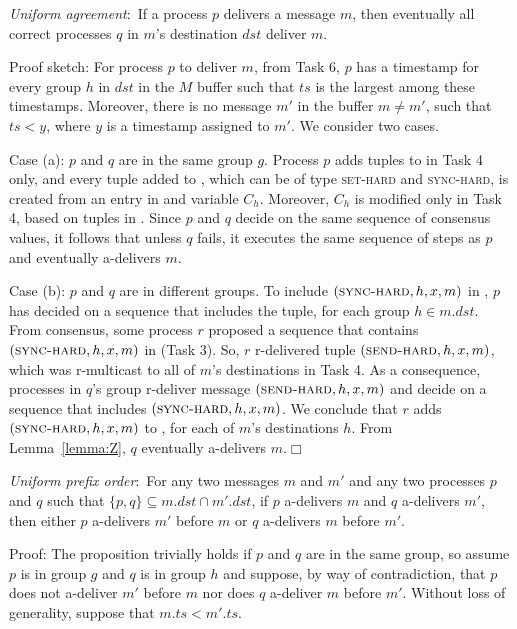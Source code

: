 \setcounter{proposition}{4}
\begin{proposition}
\textit{Uniform agreement}:~If a process $p$ delivers a message $m$, then eventually all correct processes $q$ in $m$'s destination $dst$ deliver $m$.
\end{proposition}
\noindent
{\sc Proof sketch:} 
For process $p$ to deliver $m$, from Task 6, $p$ has a timestamp for every group $h$ in $dst$ in the $M$ buffer such that $ts$ is the largest among these timestamps.
Moreover, there is no message $m'$ in the buffer $m \neq m'$, such that $ts < y$, where $y$ is a timestamp assigned to $m'$.
We consider two cases.

Case (a): $p$ and $q$ are in the same group $g$.
Process $p$ adds tuples to \Buffer in Task 4 only, and every tuple added to \Buffer, which can be of type \textsc{set-hard} and \textsc{sync-hard}, is created from an entry in \Decided and variable $C_h$.
Moreover, $C_h$ is modified only in Task 4, based on tuples in \Decided.
Since $p$ and $q$ decide on the same sequence of consensus values, it follows that unless $q$ fails, it executes the same sequence of steps as $p$ and eventually a-delivers $m$.

Case (b): $p$ and $q$ are in different groups.
To include $(\textsc{sync-hard}, h, x, m)$ in \Buffer, $p$ has decided on a sequence that includes the tuple, for each group $h \in m.dst$.
From consensus, some process $r$ proposed a sequence that contains $(\textsc{sync-hard}, h, x, m)$ in \Pend (Task 3).
So, $r$ r-delivered tuple $(\textsc{send-hard}, h, x, m)$, which was r-multicast to all of $m$'s destinations in Task 4.
As a consequence, processes in $q$'s group r-deliver message $(\textsc{send-hard}, h, x, m)$ and decide on a sequence that includes $(\textsc{sync-hard}, h, x, m)$.
We conclude that $r$ adds $(\textsc{sync-hard}, h, x, m)$ to \Buffer, for each of $m$'s destinations $h$.
From Lemma~\ref{lemma:Z}, $q$ eventually a-delivers $m$.\hfill$\Box$


\begin{proposition}
\textit{Uniform prefix order}:~For any two messages $m$ and $m'$ and any two processes $p$ and $q$ such that $\lbrace p, q\rbrace \subseteq m.\mathit{dst} \cap m'.\mathit{dst}$, if $p$ a-delivers $m$ and $q$ a-delivers $m'$, then either $p$ a-delivers $m'$ before $m$ or $q$ a-delivers $m$ before $m'$.
\end{proposition}
\noindent
{\sc Proof:} 
The proposition trivially holds if $p$ and $q$ are in the same group, so assume $p$ is in group $g$ and $q$ is in group $h$ and suppose, by way of contradiction, that $p$ does not a-deliver $m'$ before $m$ nor does $q$ a-deliver $m$ before $m'$. 
Without loss of generality, suppose that $m.ts < m'.ts$. 

